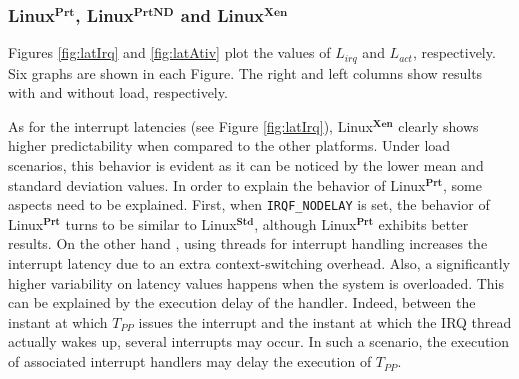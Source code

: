 \documentclass{acm_proc_article-sp}
\newcommand{\cod}[1]{\hspace{0.1cm}\texttt{#1}}
\begin{document}
\subsubsection{Linux$^\mathbf{Prt}$, Linux$^\mathbf{PrtND}$ and
  Linux$^\mathbf{Xen}$}

Figures \ref{fig:latIrq} and \ref{fig:latAtiv} plot the values of $L_{irq}$ and
$L_{act}$, respectively.  Six graphs are shown in each Figure. The right and left
columns show results with and without load, respectively.

As for the interrupt latencies (see Figure \ref{fig:latIrq}), Linux$^{\mathbf{Xen}}$
clearly shows higher predictability when compared to the other platforms. Under load
scenarios, this behavior is evident as it can be noticed by the lower mean and
standard deviation values. In order to explain the behavior of
Linux$^{\mathbf{Prt}}$, some aspects need to be explained.  First, when
\cod{IRQF\_NODELAY} is set, the behavior of Linux$^{\mathbf{Prt}}$ turns to be
similar to Linux$^{\mathbf{Std}}$, although Linux$^{\mathbf{Prt}}$ exhibits better
results. On the other hand , using threads for interrupt handling increases the
interrupt latency due to an extra context-switching overhead.  Also, a significantly
higher variability on latency values happens when the system is overloaded. This can
be explained by the execution delay of the handler.  Indeed, between the instant at
which $T_{PP}$ issues the interrupt and the instant at which the IRQ thread actually
wakes up, several interrupts may occur.  In such a scenario, the execution of
associated interrupt handlers may delay the execution of $T_{PP}$.
\end{document}
